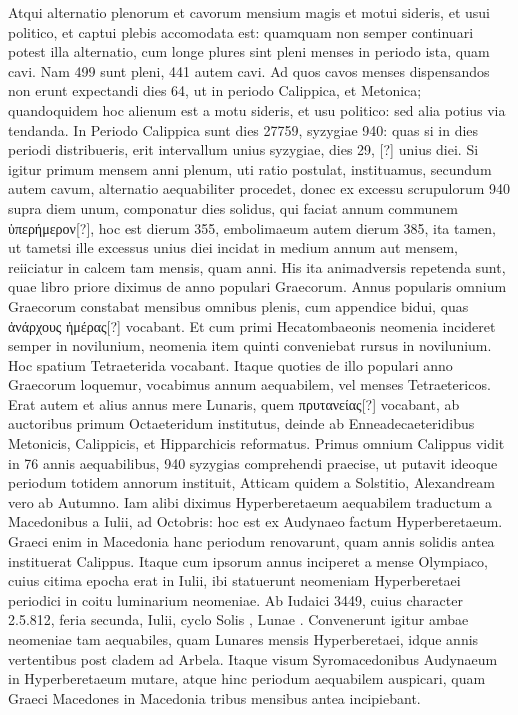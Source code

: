 Atqui alternatio plenorum et cavorum mensium
magis et motui sideris, et usui politico, et captui plebis accomodata
est: quamquam non semper continuari potest illa alternatio, cum
longe plures sint pleni menses in periodo ista, quam cavi.
Nam 499 sunt
pleni, 441 autem cavi.
Ad quos cavos menses dispensandos non erunt
expectandi dies 64, ut in periodo Calippica, et Metonica; quandoquidem
hoc alienum est a motu sideris, et usu politico: sed alia potius
via tendanda.
In Periodo Calippica sunt dies 27759, syzygiae 940:
quas si in dies periodi distribueris, erit intervallum unius syzygiae, dies
29, [?] unius diei.
Si igitur primum mensem anni plenum, uti ratio
postulat, instituamus, secundum autem cavum, alternatio aequabiliter
procedet, donec ex excessu scrupulorum 940 supra diem unum,
componatur dies solidus, qui faciat annum communem
 \textgreek{ὑπερήμερον[?]},
hoc est dierum 355, embolimaeum autem dierum 385, ita tamen, ut
tametsi ille excessus unius diei incidat in medium annum aut mensem,
reiiciatur in calcem tam mensis, quam anni.
 His ita animadversis
repetenda sunt, quae libro priore diximus de anno populari Graecorum.
Annus popularis omnium Graecorum constabat mensibus omnibus
plenis, cum appendice bidui, quas
 \textgreek{ἀνάρχους ἡμέρας[?]} vocabant.
Et cum
primi Hecatombaeonis neomenia incideret semper in novilunium,
neomenia item quinti conveniebat rursus in novilunium.
Hoc spatium Tetraeterida vocabant.
Itaque quoties de illo populari anno
Graecorum loquemur, vocabimus annum aequabilem, vel menses
Tetraetericos.
Erat autem et alius annus mere Lunaris, quem
 \textgreek{πρυτανείας[?]}
vocabant, ab auctoribus primum Octaeteridum institutus, deinde
ab Enneadecaeteridibus Metonicis, Calippicis, et Hipparchicis reformatus.
Primus omnium Calippus vidit in 76 annis aequabilibus, 940
syzygias comprehendi praecise, ut putavit ideoque periodum totidem annorum
instituit, Atticam quidem a Solstitio, Alexandream vero ab Autumno.
Iam alibi diximus Hyperberetaeum aequabilem traductum a
Macedonibus a  Iulii, ad  Octobris:
 hoc est ex Audynaeo factum
Hyperberetaeum.
Graeci enim in Macedonia hanc periodum renovarunt,
quam annis  solidis antea instituerat Calippus.
Itaque
cum ipsorum annus inciperet a mense Olympiaco, cuius citima epocha
erat in  Iulii, ibi statuerunt neomeniam Hyperberetaei periodici
in coitu luminarium neomeniae.
Ab Iudaici 3449, cuius character 2.5.812,
feria secunda,  Iulii, cyclo Solis , Lunae .
Convenerunt
igitur ambae neomeniae tam aequabiles, quam Lunares mensis Hyperberetaei,
idque  annis vertentibus post cladem ad Arbela.
Itaque
visum Syromacedonibus Audynaeum in Hyperberetaeum mutare, atque
hinc periodum aequabilem auspicari, quam Graeci Macedones in Macedonia
tribus mensibus antea incipiebant.

